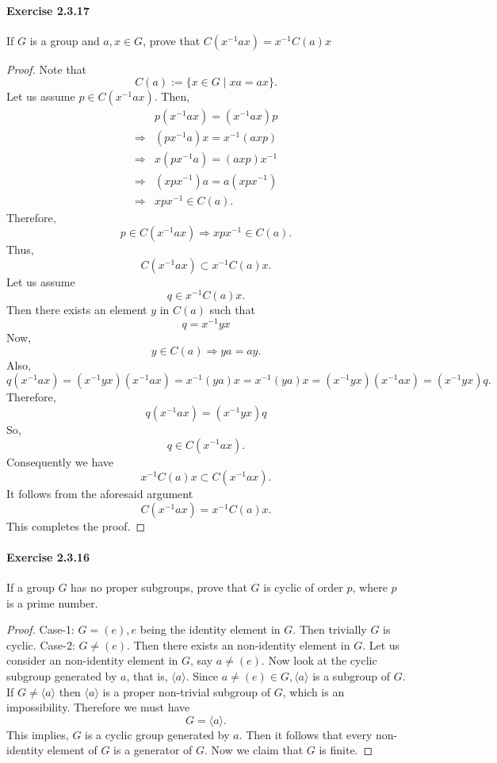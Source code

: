 \documentclass{article}
\begin{document}
\paragraph{Exercise 2.3.17} If $G$ is a group and $a, x \in G$, prove that $C\left(x^{-1} a x\right)=x^{-1} C(a) x$
\begin{proof}
    Note that
$$
C(a):=\{x \in G \mid x a=a x\} .
$$
Let us assume $p \in C\left(x^{-1} a x\right)$. Then,
$$
\begin{aligned}
& p\left(x^{-1} a x\right)=\left(x^{-1} a x\right) p \\
\Longrightarrow & \left(p x^{-1} a\right) x=x^{-1}(a x p) \\
\Longrightarrow & x\left(p x^{-1} a\right)=(a x p) x^{-1} \\
\Longrightarrow & \left(x p x^{-1}\right) a=a\left(x p x^{-1}\right) \\
\Longrightarrow & x p x^{-1} \in C(a) .
\end{aligned}
$$
Therefore,
$$
p \in C\left(x^{-1} a x\right) \Longrightarrow x p x^{-1} \in C(a) .
$$
Thus,
$$
C\left(x^{-1} a x\right) \subset x^{-1} C(a) x .
$$
Let us assume
$$
q \in x^{-1} C(a) x .
$$
Then there exists an element $y$ in $C(a)$ such that
$$
q=x^{-1} y x
$$
Now,
$$
y \in C(a) \Longrightarrow y a=a y .
$$
Also,
$$
q\left(x^{-1} a x\right)=\left(x^{-1} y x\right)\left(x^{-1} a x\right)=x^{-1}(y a) x=x^{-1}(y a) x=\left(x^{-1} y x\right)\left(x^{-1} a x\right)=\left(x^{-1} y x\right) q .
$$
Therefore,
$$
q\left(x^{-1} a x\right)=\left(x^{-1} y x\right) q
$$
So,
$$
q \in C\left(x^{-1} a x\right) .
$$
Consequently we have
$$
x^{-1} C(a) x \subset C\left(x^{-1} a x\right) .
$$
It follows from the aforesaid argument
$$
C\left(x^{-1} a x\right)=x^{-1} C(a) x .
$$
This completes the proof.
\end{proof}


\paragraph{Exercise 2.3.16} If a group $G$ has no proper subgroups, prove that $G$ is cyclic of order $p$, where $p$ is a prime number.
\begin{proof}
    Case-1: $G=(e), e$ being the identity element in $G$. Then trivially $G$ is cyclic.
    Case-2: $G \neq(e)$. Then there exists an non-identity element in $G.$ Let us consider an non-identity element in $G$, say $a\neq (e)$. Now look at the cyclic subgroup generated by $a$, that is, $\langle a\rangle$. Since
    $a\neq (e) \in G,\langle a\rangle$ is a subgroup of $G$.
If $G \neq\langle a\rangle$ then $\langle a\rangle$ is a proper non-trivial subgroup of $G$, which is an impossibility. Therefore we must have
$$
G=\langle a\rangle .
$$
This implies, $G$ is a cyclic group generated by $a$. Then it follows that every non-identity element of $G$ is a generator of $G$. Now we claim that $G$ is finite.
\end{proof}
\end{document}
